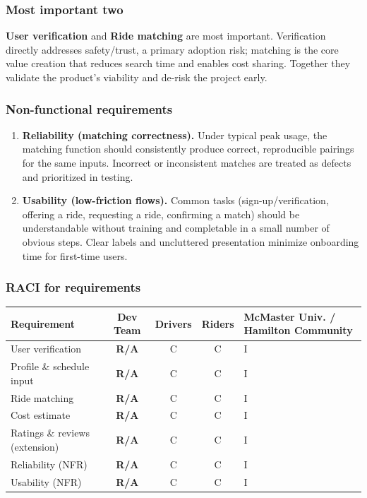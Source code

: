 \documentclass[12pt,letterpaper]{article}
\begin{document}
\subsubsection*{Most important two}
\textbf{User verification} and \textbf{Ride matching} are most important.
Verification directly addresses safety/trust, a primary adoption risk; matching is the core value creation that reduces search time and enables cost sharing. Together they validate the product’s viability and de-risk the project early.

\subsubsection*{Non-functional requirements}
\begin{enumerate}
  \item \textbf{Reliability (matching correctness).}
  Under typical peak usage, the matching function should consistently produce correct, reproducible pairings for the same inputs.
  Incorrect or inconsistent matches are treated as defects and prioritized in testing.

  \item \textbf{Usability (low-friction flows).}
  Common tasks (sign-up/verification, offering a ride, requesting a ride, confirming a match) should be understandable without training and completable in a small number of obvious steps.
  Clear labels and uncluttered presentation minimize onboarding time for first-time users.
\end{enumerate}

\subsubsection*{RACI for requirements}
\begin{center}
\begin{tabularx}{\textwidth}{@{}l c c c >{\raggedright\arraybackslash}X@{}}
\hline
\textbf{Requirement} & \textbf{Dev Team} & \textbf{Drivers} & \textbf{Riders} & \textbf{McMaster Univ. / Hamilton Community} \\
\hline
User verification & \textbf{R/A} & C & C & I \\
Profile \& schedule input & \textbf{R/A} & C & C & I \\
Ride matching & \textbf{R/A} & C & C & I \\
Cost estimate & \textbf{R/A} & C & C & I \\
Ratings \& reviews (extension) & \textbf{R/A} & C & C & I \\
Reliability (NFR) & \textbf{R/A} & C & C & I \\
Usability (NFR) & \textbf{R/A} & C & C & I \\
\hline
\end{tabularx}
\end{center}
\end{document}
